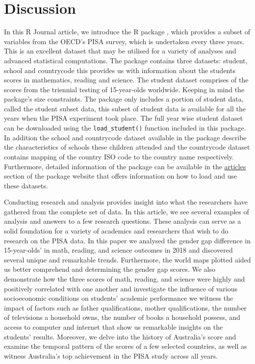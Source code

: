 \section{Discussion}\label{discussion}

In this R Journal article, we introduce the R package , which provides a subset of variables from the OECD's PISA survey, which is undertaken every three years. This is an excellent dataset that may be utilised for a variety of analyses and advanced statistical computations. The package contains three datasets: student, school and countrycode this provides us with information about the students scores in mathematics, reading and science. The student dataset comprises of the scores from the triennial testing of 15-year-olds worldwide. Keeping in mind the package's size constraints. The package only includes a portion of student data, called the student subset data, this subset of student data is available for all the years when the PISA experiment took place. The full year wise student dataset can be downloaded using the \texttt{load\_student()} function included in this package. In addition the school and countrycode dataset available in the package describe the characteristics of schools these children attended and the countrycode dataset contains mapping of the country ISO code to the country name respectively. Furthermore, detailed information of the  package can be available in the \href{https://kevinwang09.github.io/learningtower/articles/learningtower_school.html}{articles} section of the package website that offers information on how to load and use these datasets.

Conducting research and analysis provides insight into what the researchers have gathered from the complete set of data. In this article, we see several examples of analysis and answers to a few research questions. These analysis can serve as a solid foundation for a variety of academics and researchers that wish to do research on the PISA data. In this paper we analysed the gender gap difference in 15-year-olds' in math, reading, and science outcomes in 2018 and discovered several unique and remarkable trends. Furthermore, the world maps plotted aided us better comprehend and determining the gender gap scores. We also demonstrate how the three scores of math, reading, and science were highly and positively correlated with one another and investigate the influence of various socioeconomic conditions on students' academic performance we witness the impact of factors such as father qualifications, mother qualifications, the number of televisions a household owns, the number of books a household possess, and access to computer and internet that show us remarkable insights on the students' results. Moreover, we delve into the history of Australia's score and examine the temporal pattern of the scores of a few selected countries, as well as witness Australia's top achievement in the PISA study across all years.

